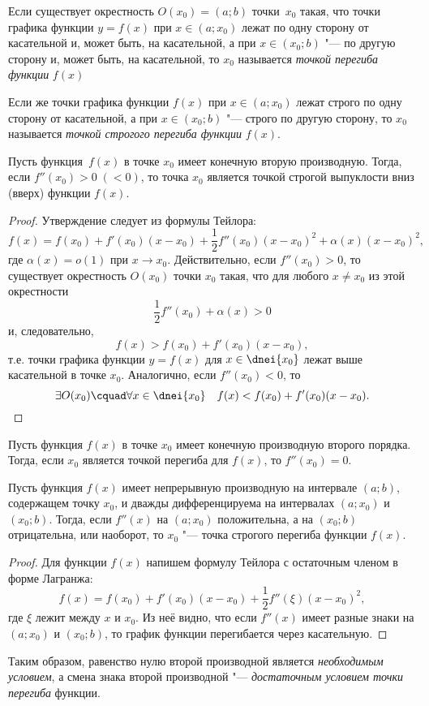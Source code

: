 \begin{defn}
Если существует окрестность $O(x_0)=(a;b)$ точки~$x_0$ такая, что точки графика функции $y=f(x)$ при $x\in (a;x_0)$ лежат по одну сторону от касательной и, может быть, на касательной, а при $x\in(x_0;b)$ "--- по другую сторону и, может быть, на касательной, то $x_0$ называется \textit{точкой перегиба функции} $f(x)$

Если же точки графика функции $f(x)$ при $x\in(a;x_0)$ лежат строго по одну сторону от касательной, а при $x\in (x_0;b)$ "--- строго по другую сторону, то $x_0$ называется \textit{точкой строгого перегиба функции} $f(x)$.
\end{defn}

\begin{thm}
Пусть функция~$f(x)$ в точке $x_0$ имеет конечную вторую производную. Тогда, если $f''(x_0)>0\; (<0)$, то точка $x_0$ является точкой строгой выпуклости вниз (вверх) функции $f(x)$. 
\end{thm}

\begin{proof}
Утверждение следует из формулы Тейлора:
$$
f(x)=f(x_0)+f'(x_0)(x-x_0)+\frac{1}{2}f''(x_0)(x-x_0)^2+\alpha(x)(x-x_0)^2,
$$
где $\alpha(x)=o(1)$ при $x\to x_0$. Действительно, если $f''(x_0)>0$, то существует окрестность $O(x_0)$ точки $x_0$ такая, что для любого $x\neq x_0$ из этой окрестности
$$
\frac{1}{2}f''(x_0)+\alpha(x)>0
$$
и, следовательно, 
$$
f(x)>f(x_0)+f'(x_0)(x-x_0),
$$
т.е. точки графика функции $y=f(x)$ для $x\in\dnei {x_0}$ лежат выше касательной в точке $x_0$. Аналогично, если $f''(x_0)<0$, то
\begin{equation*}
\exists O(x_0)\cquad \forall x\in \dnei {x_0} \quad f(x)<f(x_0)+f'(x_0)(x-x_0). \qedhere
\end{equation*}
\end{proof}

\begin{cons}
Пусть функция $f(x)$ в точке $x_0$ имеет конечную производную второго порядка. Тогда, если $x_0$ является точкой перегиба для $f(x)$, то $f''(x_0)=0$.
\end{cons}

\begin{thm}
Пусть функция $f(x)$ имеет непрерывную производную на интервале $(a;b)$, содержащем точку $x_0$, и дважды дифференцируема на интервалах $(a;x_0)$ и $(x_0;b)$. Тогда, если $f''(x)$ на $(a;x_0)$ положительна, а на $(x_0;b)$ отрицательна, или наоборот, то $x_0$ "--- точка строгого перегиба функции $f(x)$. 
\end{thm}

\begin{proof}
Для функции $f(x)$ напишем формулу Тейлора с остаточным членом в форме Лагранжа:
$$
f(x)=f(x_0)+f'(x_0)(x-x_0)+\frac{1}{2}f''(\xi)(x-x_0)^2,
$$
где $\xi$ лежит между $x$ и $x_0$. Из неё видно, что если $f''(x)$ имеет разные знаки на $(a;x_0)$ и $(x_0;b)$, то график функции перегибается через касательную.
\end{proof}

Таким образом, равенство нулю второй производной является \textit{необходимым условием}, а смена знака второй производной "--- \textit{достаточным условием точки перегиба} функции.

